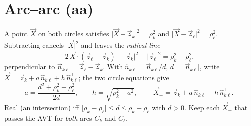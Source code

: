 \documentclass[11pt]{article}
\newcommand{\vv}[1]{\vec{#1}}
\begin{document}
\section{Arc--arc (aa)}

A point $\vv X$ on both circles satisfies $\lvert\vv X-\vv z_k\rvert^{2}=\rho_k^{2}$ and
$\lvert\vv X-\vv z_\ell\rvert^{2}=\rho_\ell^{2}$. Subtracting cancels $\lvert\vv X\rvert^{2}$ and
leaves the \emph{radical line}
\[
  2\,\vv X\!\cdot\!(\vv z_\ell-\vv z_k)+\lvert\vv z_k\rvert^{2}-\lvert\vv z_\ell\rvert^{2}=\rho_k^{2}-\rho_\ell^{2},
\]
perpendicular to $\vv n_{k\ell}=\vv z_\ell-\vv z_k$. With $\hat n_{k\ell}=\vv n_{k\ell}/d$,
$d=\lvert\vv n_{k\ell}\rvert$, write $\vv X=\vv z_k+a\,\hat n_{k\ell}+h\,\hat n_{k\ell}^{\perp}$;
the two circle equations give
\[
  a=\frac{d^{2}+\rho_k^{2}-\rho_\ell^{2}}{2d},\qquad
  h=\sqrt{\rho_k^{2}-a^{2}},\qquad
  \boxed{\;\vv X_{\pm}=\vv z_k+a\,\hat n_{k\ell}\pm h\,\hat n_{k\ell}^{\perp}.\;}
\]
Real (an intersection) iff $\lvert\rho_k-\rho_\ell\rvert\le d\le\rho_k+\rho_\ell$ with $d>0$.
Keep each $\vv X_{\pm}$ that passes the AVT for \emph{both} arcs $C_k$ and $C_\ell$.
\end{document}
